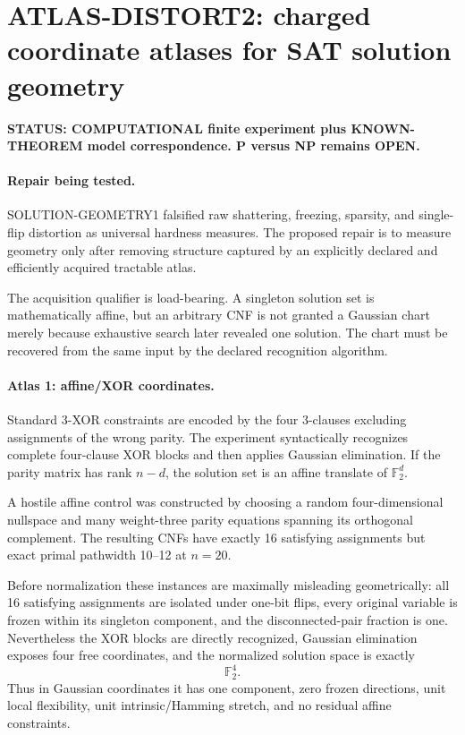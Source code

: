 \section*{ATLAS-DISTORT2: charged coordinate atlases for SAT solution geometry}

\textbf{STATUS: COMPUTATIONAL finite experiment plus KNOWN-THEOREM model correspondence. P versus NP remains OPEN.}

\paragraph{Repair being tested.}
SOLUTION-GEOMETRY1 falsified raw shattering, freezing, sparsity, and single-flip distortion as universal hardness measures. The proposed repair is to measure geometry only after removing structure captured by an explicitly declared and efficiently acquired tractable atlas.

The acquisition qualifier is load-bearing. A singleton solution set is mathematically affine, but an arbitrary CNF is not granted a Gaussian chart merely because exhaustive search later revealed one solution. The chart must be recovered from the same input by the declared recognition algorithm.

\paragraph{Atlas 1: affine/XOR coordinates.}
Standard 3-XOR constraints are encoded by the four 3-clauses excluding assignments of the wrong parity. The experiment syntactically recognizes complete four-clause XOR blocks and then applies Gaussian elimination. If the parity matrix has rank $n-d$, the solution set is an affine translate of $\mathbb F_2^d$.

A hostile affine control was constructed by choosing a random four-dimensional nullspace and many weight-three parity equations spanning its orthogonal complement. The resulting CNFs have exactly 16 satisfying assignments but exact primal pathwidth 10--12 at $n=20$.

Before normalization these instances are maximally misleading geometrically: all 16 satisfying assignments are isolated under one-bit flips, every original variable is frozen within its singleton component, and the disconnected-pair fraction is one. Nevertheless the XOR blocks are directly recognized, Gaussian elimination exposes four free coordinates, and the normalized solution space is exactly
\[ \mathbb F_2^4. \]
Thus in Gaussian coordinates it has one component, zero frozen directions, unit local flexibility, unit intrinsic/Hamming stretch, and no residual affine constraints.

